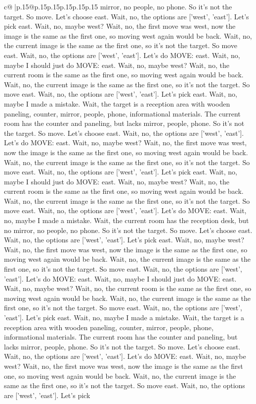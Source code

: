 \documentclass{article}
\begin{document}
{\begin{supertabular}{c@{$\;$}|p{.15\linewidth}@{}p{.15\linewidth}p{.15\linewidth}p{.15\linewidth}p{.15\linewidth}p{.15\linewidth}}
{{{mirror, no people, no phone. So it's not the target. So move. Let's choose east. Wait, no, the options are ['west', 'east']. Let's pick east. Wait, no, maybe west? Wait, no, the first move was west, now the image is the same as the first one, so moving west again would be back. Wait, no, the current image is the same as the first one, so it's not the target. So move east. Wait, no, the options are ['west', 'east']. Let's do MOVE: east. Wait, no, maybe I should just do MOVE: east. Wait, no, maybe west? Wait, no, the current room is the same as the first one, so moving west again would be back. Wait, no, the current image is the same as the first one, so it's not the target. So move east. Wait, no, the options are ['west', 'east']. Let's pick east. Wait, no, maybe I made a mistake. Wait, the target is a reception area with wooden paneling, counter, mirror, people, phone, informational materials. The current room has the counter and paneling, but lacks mirror, people, phone. So it's not the target. So move. Let's choose east. Wait, no, the options are ['west', 'east']. Let's do MOVE: east. Wait, no, maybe west? Wait, no, the first move was west, now the image is the same as the first one, so moving west again would be back. Wait, no, the current image is the same as the first one, so it's not the target. So move east. Wait, no, the options are ['west', 'east']. Let's pick east. Wait, no, maybe I should just do MOVE: east. Wait, no, maybe west? Wait, no, the current room is the same as the first one, so moving west again would be back. Wait, no, the current image is the same as the first one, so it's not the target. So move east. Wait, no, the options are ['west', 'east']. Let's do MOVE: east. Wait, no, maybe I made a mistake. Wait, the current room has the reception desk, but no mirror, no people, no phone. So it's not the target. So move. Let's choose east. Wait, no, the options are ['west', 'east']. Let's pick east. Wait, no, maybe west? Wait, no, the first move was west, now the image is the same as the first one, so moving west again would be back. Wait, no, the current image is the same as the first one, so it's not the target. So move east. Wait, no, the options are ['west', 'east']. Let's do MOVE: east. Wait, no, maybe I should just do MOVE: east. Wait, no, maybe west? Wait, no, the current room is the same as the first one, so moving west again would be back. Wait, no, the current image is the same as the first one, so it's not the target. So move east. Wait, no, the options are ['west', 'east']. Let's pick east. Wait, no, maybe I made a mistake. Wait, the target is a reception area with wooden paneling, counter, mirror, people, phone, informational materials. The current room has the counter and paneling, but lacks mirror, people, phone. So it's not the target. So move. Let's choose east. Wait, no, the options are ['west', 'east']. Let's do MOVE: east. Wait, no, maybe west? Wait, no, the first move was west, now the image is the same as the first one, so moving west again would be back. Wait, no, the current image is the same as the first one, so it's not the target. So move east. Wait, no, the options are ['west', 'east']. Let's pick }}}
\end{supertabular}}
\end{document}
